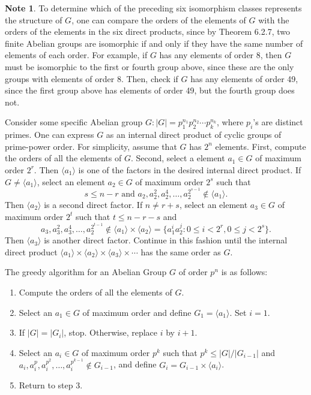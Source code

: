 \documentclass{article}
\theoremstyle{definition}
\newtheorem{note}{Note}[section]
\begin{document}
\begin{note}
        To determine which of the preceding six isomorphism classes represents the structure of $G$, one can compare the orders of the elements of $G$ with the orders of the elements in the six direct products, since by Theorem 6.2.7, two finite Abelian groups are isomorphic if and only if they have the same number of elements of each order. For example, if $G$ has any elements of order 8, then $G$ must be isomorphic to the first or fourth group above, since these are the only groups with elements of order 8. Then, check if $G$ has any elements of order 49, since the first group above has elements of order 49, but the fourth group does not.
        
        Consider some specific Abelian group $G:|G|=p_1^{n_1}p_2^{n_2}\cdots p_k^{n_k}$, where $p_i$'s are distinct primes. One can express $G$ as an internal direct product of cyclic groups of prime-power order. For simplicity, assume that $G$ has $2^n$ elements. First, compute the orders of all the elements of $G$. Second, select a element $a_1\in G$ of maximum order $2^r$. Then $\langle a_1 \rangle$ is one of the factors in the desired internal direct product. If $G\neq\langle a_1 \rangle$, select an element $a_2\in G$ of maximum order $2^s$ such that
        \begin{equation*}
            s \leq n-r \text{ and } a_2,a_2^2,a_2^4,\dots,a_2^{2^{s-1}}\notin\langle a_1 \rangle.
        \end{equation*}
         Then $\langle a_2 \rangle$ is a second direct factor. If $n\neq r+s$, select an element $a_3\in G$ of maximum order $2^t$ such that $t\leq n-r-s$ and
         \begin{equation*}
            a_3,a_3^2,a_3^4,\dots,a_2^{2^{t-1}} \notin\langle a_1 \rangle \times \langle a_2 \rangle = \{a_1^ia_2^j: 0\leq i<2^r,0\leq j<2^s\}.
        \end{equation*}
        Then $\langle a_3 \rangle$ is another direct factor. Continue in this fashion until the internal direct product $\langle a_1\rangle\times\langle a_2\rangle\times\langle a_3\rangle\times\cdots$ has the same order as $G$.
        
        The greedy algorithm for an Abelian Group $G$ of order $p^n$ is as follows:
        \begin{enumerate}
            \item Compute the orders of all the elements of $G$.
            \item Select an $a_1\in G$ of maximum order and define $G_1=\langle a_1 \rangle$. Set $i=1$.
            \item If $|G|=|G_i|$, stop. Otherwise, replace $i$ by $i+1$.
            \item Select an $a_i\in G$ of maximum order $p^k$ such that $p^k\leq|G|/|G_{i-1}|$ and  $a_i,a_i^p,a_i^{p^2},\dots,a_i^{p^{k-1}}\notin G_{i-1}$, and define $G_i=G_{i-1}\times\langle a_i\rangle$.
            \item Return to step 3.
        \end{enumerate}
        

\end{note}
\end{document}
